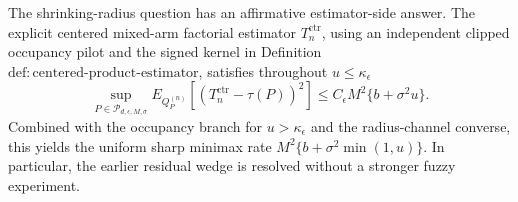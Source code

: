 The shrinking-radius question has an affirmative estimator-side answer.  The explicit centered mixed-arm factorial estimator \(T_n^{\mathrm{ctr}}\), using an independent clipped occupancy pilot and the signed kernel in Definition~\(\mathrm{def:centered\text{-}product\text{-}estimator}\), satisfies throughout \(u\le\kappa_{\epsilon}\)
\[
 \sup_{P\in\mathcal P_{d,\epsilon,M,\sigma}}
 E_{Q_P^{(n)}}[(T_n^{\mathrm{ctr}}-\tau(P))^2]
 \le C_{\epsilon}M^2\{b+\sigma^2u\}.
\]
Combined with the occupancy branch for \(u>\kappa_{\epsilon}\) and the radius-channel converse, this yields the uniform sharp minimax rate \(M^2\{b+\sigma^2\min(1,u)\}\).  In particular, the earlier residual wedge is resolved without a stronger fuzzy experiment.